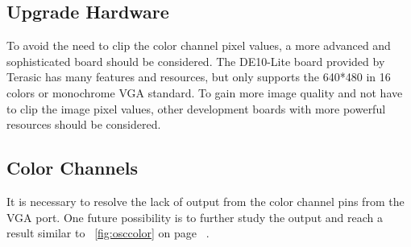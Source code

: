 \subsection{Upgrade Hardware}
\par To avoid the need to clip the color channel pixel values, a more advanced and sophisticated board should be considered. The DE10-Lite board provided by Terasic has many features and resources, but only supports the 640*480 in 16 colors or monochrome VGA standard. To gain more image quality and not have to clip the image pixel values, other development boards with more powerful resources should be considered. \newline

\subsection{Color Channels}
\par It is necessary to resolve the lack  of output from the color channel pins from the VGA port. One future possibility is to further study the output and reach a result similar to ~\ref{fig:osccolor} on page ~\pageref{fig:osccolor}. \newline